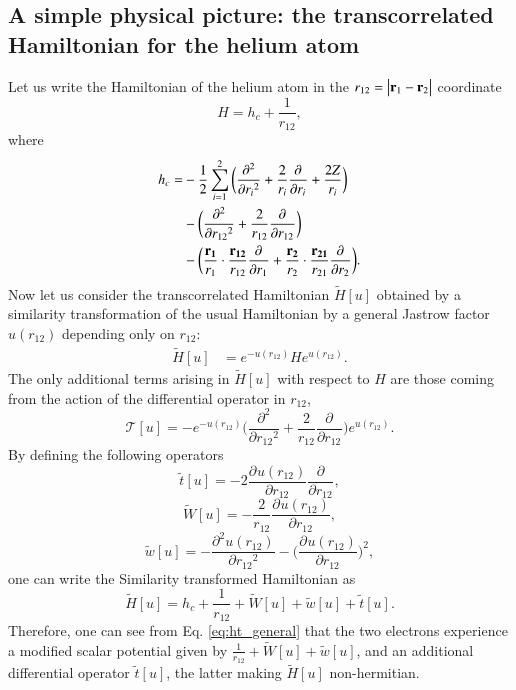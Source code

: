 \documentclass[aip,jcp,reprint,noshowkeys,superscriptaddress]{revtex4-1}
\newcommand{\deriv}[3]{\frac{\partial^{#3} #1}{\partial {#2}^{#3}}}
\newcommand{\bd}[1]{{\bf {#1}}}
\begin{document}
\subsection{A simple physical picture: the transcorrelated Hamiltonian for the helium atom}
Let us write the Hamiltonian of the helium atom in the $ r_{12} = \big|{\bf r}_1 - {\bf r}_2 \big|$ coordinate 
\begin{equation}
 H  = h_c + \frac{1}{r_{12}},
\end{equation}
where 
\begin{equation}
 \begin{aligned}
 \label{def:h_c}
 h_c = &-\frac{1}{2} \sum_{i=1}^2 \bigg(\deriv{}{r_i}{2} + \frac{2}{r_i} \deriv{}{r_i}{} + \frac{2 Z}{r_i}\bigg) \\
     &-\bigg( \deriv{}{r_{12}}{2} + \frac{2}{r_{12}} \deriv{}{r_{12}}{} \bigg) \\
     &-\bigg( \frac{\bd{r_1}}{r_1} \cdot \frac{\bd{r_{12}} }{r_{12}}  \deriv{}{r_1}{} + 
                \frac{\bd{r_2}}{r_2} \cdot \frac{\bd{r_{21}} }{r_{21}}  \deriv{}{r_2}{} \bigg).
 \end{aligned}
\end{equation}
\label{sec:he_j}
Now let us consider the transcorrelated Hamiltonian $\tilde{H}[u]$ obtained by a similarity transformation of the usual Hamiltonian by a general Jastrow factor $u(r_{12})$ depending only on $r_{12}$: 
\begin{equation}
 \label{eq:ht_0}
 \begin{aligned}
 \tilde{H}[u]&= e^{-u(r_{12})} H e^{u(r_{12})}.
 \end{aligned}
\end{equation}
The only additional terms arising in $\tilde{H}[u]$ with respect to $H$ are those coming from the action of the differential operator in $r_{12}$,
\begin{equation}
 \mathcal{T}[u] =  -e^{-u(r_{12})}\bigg( \deriv{}{r_{12}}{2} + \frac{2}{r_{12}} \deriv{}{r_{12}}{} \bigg)e^{u(r_{12})}.  
\end{equation}
By defining the following operators 
\begin{equation}
 \label{eq:def_tt}
 \tilde{t}[u] = -2 \deriv{u(r_{12})}{r_{12}}{} \deriv{}{r_{12}}{},
\end{equation}
\begin{equation}
 \label{eq:def_wt}
 \tilde{W}[u] = -\frac{2}{r_{12}} \deriv{u(r_{12})}{r_{12}}{}  , 
\end{equation}
\begin{equation}
 \label{eq:def_wt}
 \tilde{w}[u] = -\deriv{u(r_{12})}{r_{12}}{2} - \bigg( \deriv{u(r_{12})}{r_{12}}{} \bigg)^2, 
\end{equation}
one can write the Similarity transformed Hamiltonian  as
\begin{equation}
 \label{eq:ht_general}
 \tilde{H}[u] = h_c + \frac{1}{r_{12}}  + \tilde{W}[u] + \tilde{w}[u] + \tilde{t}[u].
\end{equation}
Therefore, one can see from Eq. \eqref{eq:ht_general} that the two electrons experience a modified scalar potential given by $\frac{1}{r_{12}}  + \tilde{W}[u] + \tilde{w}[u]$, and an additional differential operator $\tilde{t}[u]$, 
the latter making $\tilde{H}[u]$ non-hermitian.   
\end{document}
